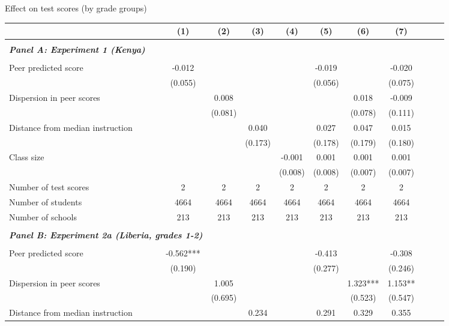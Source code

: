 \begin{center} 
\caption{\small Effect on test scores (by grade groups)} 
\label{tab:descriptives} 
\begin{scriptsize}
\begin{threeparttable}
\begin{tabular} {@{} l l c c c c c c c c c c  @{}} \toprule \toprule
& &(1)&(2)&(3)&(4)&(5)&(6)&(7) \\ \midrule 
\\
\multicolumn{3}{l}{\textbf{\textit{Panel A: Experiment 1 (Kenya)}}} \\
\\
Peer predicted score &  & -0.012 &  &  &  & -0.019 &  & -0.020 \\
                 &  & (0.055) &  &  &  & (0.056) &  & (0.075) \\
Dispersion in peer scores &  &  & 0.008 &  &  &  & 0.018 & -0.009 \\
                 &  &  & (0.081) &  &  &  & (0.078) & (0.111) \\
Distance from median instruction &  &  &  & 0.040 &  & 0.027 & 0.047 & 0.015 \\
                 &  &  &  & (0.173) &  & (0.178) & (0.179) & (0.180) \\
Class size &  &  &  &  & -0.001 & 0.001 & 0.001 & 0.001 \\
                 &  &  &  &  & (0.008) & (0.008) & (0.007) & (0.007) \\
\midrule
Number of test scores &  & 2 & 2 & 2 & 2 & 2 & 2 & 2 \\
Number of students &  & 4664 & 4664 & 4664 & 4664 & 4664 & 4664 & 4664 \\
Number of schools &  & 213 & 213 & 213 & 213 & 213 & 213 & 213 \\
 \midrule
\\
\multicolumn{3}{l}{\textbf{\textit{Panel B: Experiment 2a (Liberia, grades 1-2)}}} \\
\\
Peer predicted score &  & -0.562*** &  &  &  & -0.413 &  & -0.308 \\
                 &  & (0.190) &  &  &  & (0.277) &  & (0.246) \\
Dispersion in peer scores &  &  & 1.005 &  &  &  & 1.323*** & 1.153** \\
                 &  &  & (0.695) &  &  &  & (0.523) & (0.547) \\
Distance from median instruction &  &  &  & 0.234 &  & 0.291 & 0.329 & 0.355 \\

\end{tabular}
\end{threeparttable}
\end{scriptsize}
\end{center}
